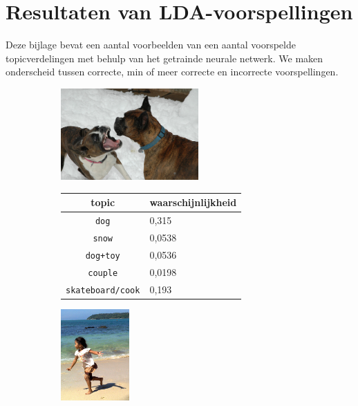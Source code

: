 \chapter{Resultaten van LDA-voorspellingen}
\label{app:LDApredictions}
Deze bijlage bevat een aantal voorbeelden van een aantal voorspelde topicverdelingen met behulp van het getrainde neurale netwerk. We maken onderscheid tussen correcte, min of meer correcte en incorrecte voorspellingen.
\newpage
\begin{figure}
\begin{subfigure}{\textwidth}
    \centering
    \begin{minipage}[t][3.5cm]{.5\linewidth}
    \centering
    \vspace{0pt}
    \includegraphics[height=3.5cm]{Images/LDA/3348384389.jpg}
    \end{minipage}\hfill
    \begin{minipage}[t]{.5\textwidth}
    \centering
    \vspace{0pt}
    \begin{tabular}{cl}
            topic                           & waarschijnlijkheid\\
            \hline
            \texttt{dog}             & 0,315 \\
            \texttt{snow}                   & 0,0538 \\
            \texttt{dog+toy} & 0,0536\\
            \texttt{couple}                  & 0,0198 \\
            \texttt{skateboard/cook}           & 0,193 \\
            \hline
        \end{tabular}
    \end{minipage}
\end{subfigure}
\vspace*{4mm}
\begin{subfigure}{\textwidth}
    \centering
    \begin{minipage}[t][3.5cm]{.5\linewidth}
    \centering
    \vspace{0pt}
    \includegraphics[height=3.5cm]{Images/LDA/3107059919.jpg}

\end{minipage}
\end{subfigure}
\end{figure}
